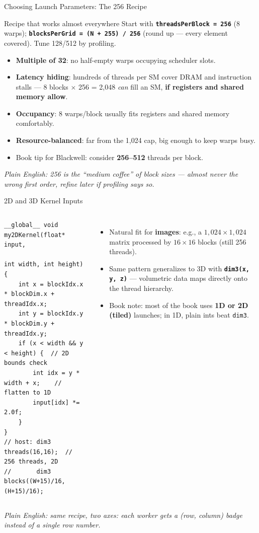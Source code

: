 \documentclass[aspectratio=169]{beamer}
\newcommand{\kw}[1]{\textbf{\textcolor{kwblue}{#1}}}
\newcommand{\pe}[1]{\par{\setlength{\fboxsep}{2.5pt}\noindent\colorbox{navy!9}{\parbox{\dimexpr\textwidth-5pt\relax}{\footnotesize\itshape Plain English: #1}}}}
\begin{document}
\begin{frame}{Choosing Launch Parameters: The 256 Recipe}
  \begin{block}{Recipe that works almost everywhere}
    Start with \kw{\texttt{threadsPerBlock = 256}} (8 warps);
    \kw{\texttt{blocksPerGrid = (N + 255) / 256}} (round up --- every element covered). Tune 128/512 by profiling.
  \end{block}
  \begin{itemize}
    \item \kw{Multiple of 32}: no half-empty warps occupying scheduler slots.
    \item \kw{Latency hiding}: hundreds of threads per SM cover DRAM and instruction stalls ---
          8 blocks $\times$ 256 = 2{,}048 \emph{can} fill an SM, \kw{if registers and shared memory allow}.
    \item \kw{Occupancy}: 8 warps/block usually fits registers and shared memory comfortably.
    \item \kw{Resource-balanced}: far from the 1{,}024 cap, big enough to keep warps busy.
    \item Book tip for Blackwell: consider \kw{256--512} threads per block.
  \end{itemize}
  \pe{256 is the ``medium coffee'' of block sizes --- almost never the wrong first order, refine later if profiling says so.}
\end{frame}

\begin{frame}[fragile]{2D and 3D Kernel Inputs}
  \begin{columns}[t]
\begin{lstlisting}
__global__ void my2DKernel(float* input,
                           int width, int height) {
    int x = blockIdx.x * blockDim.x + threadIdx.x;
    int y = blockIdx.y * blockDim.y + threadIdx.y;
    if (x < width && y < height) {  // 2D bounds check
        int idx = y * width + x;    // flatten to 1D
        input[idx] *= 2.0f;
    }
}
// host: dim3 threads(16,16);  // 256 threads, 2D
//       dim3 blocks((W+15)/16, (H+15)/16);
\end{lstlisting}
    \begin{itemize}
      \item Natural fit for \kw{images}: e.g., a $1{,}024 \times 1{,}024$ matrix processed by
            $16 \times 16$ blocks (still 256 threads).
      \item Same pattern generalizes to 3D with \kw{\texttt{dim3(x, y, z)}} ---
            volumetric data maps directly onto the thread hierarchy.
      \item Book note: most of the book uses \kw{1D or 2D (tiled)} launches;
            in 1D, plain ints beat \texttt{dim3}.
    \end{itemize}
  \end{columns}
  \pe{same recipe, two axes: each worker gets a (row, column) badge instead of a single row number.}
\end{frame}
\end{document}
